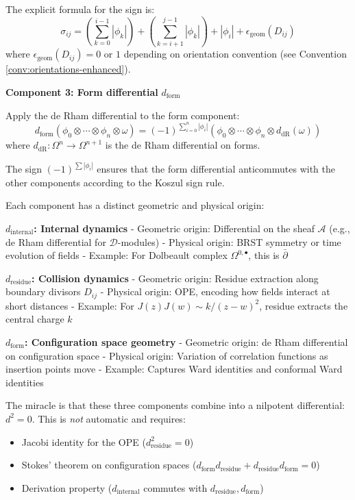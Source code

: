 \begin{definition}
The explicit formula for the sign is:
$$\sigma_{ij} = \left(\sum_{k=0}^{i-1} |\phi_k|\right) + \left(\sum_{k=i+1}^{j-1} |\phi_k|\right) + |\phi_i| + \epsilon_{\text{geom}}(D_{ij})$$
where $\epsilon_{\text{geom}}(D_{ij}) = 0$ or $1$ depending on orientation convention (see Convention \ref{conv:orientations-enhanced}).

\textbf{Component 3: Form differential} $d_{\text{form}}$

Apply the de Rham differential to the form component:
$$d_{\text{form}}\left(\phi_0 \otimes \cdots \otimes \phi_n \otimes \omega\right) = (-1)^{\sum_{i=0}^n |\phi_i|} \left(\phi_0 \otimes \cdots \otimes \phi_n \otimes d_{\text{dR}}(\omega)\right)$$
where $d_{\text{dR}}: \Omega^n \to \Omega^{n+1}$ is the de Rham differential on forms.

The sign $(-1)^{\sum |\phi_i|}$ ensures that the form differential anticommutes with the other components according to the Koszul sign rule.
\end{definition}

\begin{remark}\label{rem:three-components}
Each component has a distinct geometric and physical origin:

\textbf{$d_{\text{internal}}$: Internal dynamics}
- Geometric origin: Differential on the sheaf $\mathcal{A}$ (e.g., de Rham differential for $\mathcal{D}$-modules)
- Physical origin: BRST symmetry or time evolution of fields
- Example: For Dolbeault complex $\Omega^{0,\bullet}$, this is $\bar{\partial}$

\textbf{$d_{\text{residue}}$: Collision dynamics}
- Geometric origin: Residue extraction along boundary divisors $D_{ij}$
- Physical origin: OPE, encoding how fields interact at short distances
- Example: For $J(z)J(w) \sim k/(z-w)^2$, residue extracts the central charge $k$

\textbf{$d_{\text{form}}$: Configuration space geometry}
- Geometric origin: de Rham differential on configuration space
- Physical origin: Variation of correlation functions as insertion points move
- Example: Captures Ward identities and conformal Ward identities

The miracle is that these three components combine into a nilpotent differential: $d^2 = 0$. This is \emph{not} automatic and requires:
\begin{itemize}
\item Jacobi identity for the OPE ($d_{\text{residue}}^2 = 0$)
\item Stokes' theorem on configuration spaces ($d_{\text{form}} d_{\text{residue}} + d_{\text{residue}} d_{\text{form}} = 0$)
\item Derivation property ($d_{\text{internal}}$ commutes with $d_{\text{residue}}, d_{\text{form}}$)
\end{itemize}
\end{remark}

